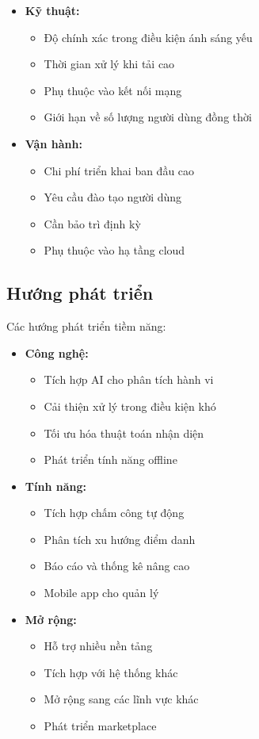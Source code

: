 \begin{itemize}
    \item \textbf{Kỹ thuật:}
    \begin{itemize}
        \item Độ chính xác trong điều kiện ánh sáng yếu
        \item Thời gian xử lý khi tải cao
        \item Phụ thuộc vào kết nối mạng
        \item Giới hạn về số lượng người dùng đồng thời
    \end{itemize}
    
    \item \textbf{Vận hành:}
    \begin{itemize}
        \item Chi phí triển khai ban đầu cao
        \item Yêu cầu đào tạo người dùng
        \item Cần bảo trì định kỳ
        \item Phụ thuộc vào hạ tầng cloud
    \end{itemize}
\end{itemize}

\subsection{Hướng phát triển}
\hspace{0.5cm}Các hướng phát triển tiềm năng:

\begin{itemize}
    \item \textbf{Công nghệ:}
    \begin{itemize}
        \item Tích hợp AI cho phân tích hành vi
        \item Cải thiện xử lý trong điều kiện khó
        \item Tối ưu hóa thuật toán nhận diện
        \item Phát triển tính năng offline
    \end{itemize}
    
    \item \textbf{Tính năng:}
    \begin{itemize}
        \item Tích hợp chấm công tự động
        \item Phân tích xu hướng điểm danh
        \item Báo cáo và thống kê nâng cao
        \item Mobile app cho quản lý
    \end{itemize}
    
    \item \textbf{Mở rộng:}
    \begin{itemize}
        \item Hỗ trợ nhiều nền tảng
        \item Tích hợp với hệ thống khác
        \item Mở rộng sang các lĩnh vực khác
        \item Phát triển marketplace
    \end{itemize}
\end{itemize}

